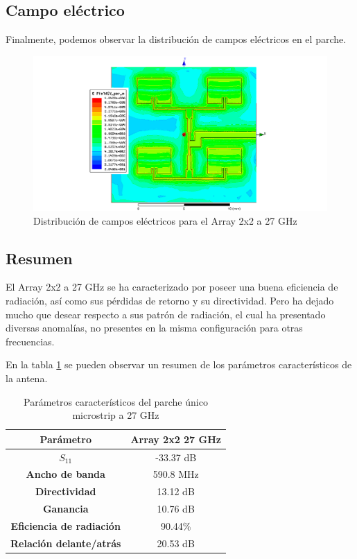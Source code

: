 \newpage
\subsection{Campo eléctrico}
\par Finalmente, podemos observar la distribución de campos eléctricos en el parche. 
\begin{figure}[H]
    \centering
        \includegraphics[width=\textwidth]{archivos/analisis/2x23/8}
        \caption{Distribución de campos eléctricos para el Array 2x2 a 27 GHz}
        \label{fig:elec2x23}
\end{figure}


\subsection{Resumen}
\par El Array 2x2 a 27 GHz se ha caracterizado por poseer una buena eficiencia de radiación, así como sus pérdidas de retorno y su directividad. Pero ha dejado mucho que desear respecto a sus patrón de radiación, el cual ha presentado diversas anomalías, no presentes en la misma configuración para otras frecuencias.
\\
\par En la tabla \ref{tab:res2x23} se pueden observar un resumen de los parámetros característicos de la antena.

\begin{table}[H]
  
  
   \small %
   \centering %
   \begin{tabular}{c c} %
   \toprule[\heavyrulewidth]\toprule[\heavyrulewidth]
   \textbf{Parámetro} & \textbf{Array 2x2 27 GHz} \\ 
   \midrule
   \textbf{$S_{11}$} & -33.37 dB \\
   \textbf{Ancho de banda} & 590.8 MHz \\
   \textbf{Directividad} & 13.12 dB \\
   \textbf{Ganancia} & 10.76 dB \\
   \textbf{Eficiencia de radiación} & 90.44\% \\
   \textbf{Relación delante/atrás} & 20.53 dB \\

   \bottomrule[\heavyrulewidth] 
   \end{tabular}
   \caption{Parámetros característicos del parche único microstrip a 27 GHz} 
    \label{tab:res2x23}
\end{table}

